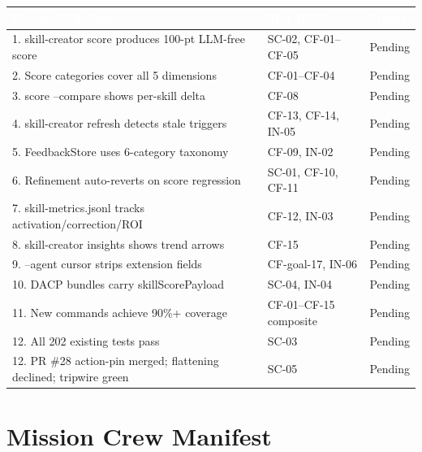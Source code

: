\documentclass[11pt,letterpaper]{article}
\newcommand{\tableheader}[1]{\textbf{\sffamily\textcolor{white}{#1}}}
\begin{document}
\begin{center}
\begin{tabularx}{\textwidth}{XL{3.5cm}C{1.5cm}}
\toprule
{}
\tableheader{Success Criterion} & \tableheader{Test ID(s)} & \tableheader{Status} \\
. skill-creator score produces 100-pt LLM-free score & SC-02, CF-01--CF-05 & Pending \\
2. Score categories cover all 5 dimensions & CF-01--CF-04 & Pending \\
3. score --compare shows per-skill delta & CF-08 & Pending \\
4. skill-creator refresh detects stale triggers & CF-13, CF-14, IN-05 & Pending \\
5. FeedbackStore uses 6-category taxonomy & CF-09, IN-02 & Pending \\
6. Refinement auto-reverts on score regression & SC-01, CF-10, CF-11 & Pending \\
7. skill-metrics.jsonl tracks activation/correction/ROI & CF-12, IN-03 & Pending \\
8. skill-creator insights shows trend arrows & CF-15 & Pending \\
9. --agent cursor strips extension fields & CF-goal-17, IN-06 & Pending \\
10. DACP bundles carry skillScorePayload & SC-04, IN-04 & Pending \\
11. New commands achieve 90\%+ coverage & CF-01--CF-15 composite & Pending \\
12. All 202 existing tests pass & SC-03 & Pending \\
12. PR \#28 action-pin merged; flattening declined; tripwire green & SC-05 & Pending \\
\bottomrule
\end{tabularx}
\end{center}

\section{Mission Crew Manifest}
\end{document}
